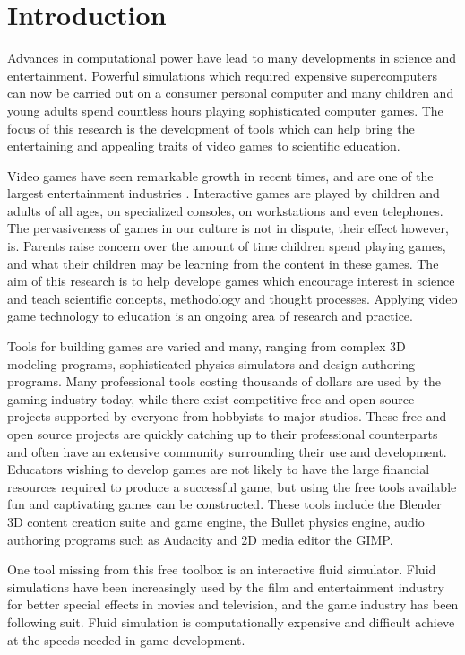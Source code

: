 \chapter{Introduction}

Advances in computational power have lead to many developments in science and
entertainment. Powerful simulations which required expensive supercomputers can
now be carried out on a consumer personal computer and many children and young
adults spend countless hours playing sophisticated computer games. The focus of
this research is the development of tools which can help bring the entertaining
and appealing traits of video games to scientific education.


Video games have seen remarkable growth in recent times, and are one of the
largest entertainment industries \cite{needed}. Interactive games are played by
children and adults of all ages, on specialized consoles, on workstations and
even telephones. The pervasiveness of games in our culture is not in dispute,
their effect however, is.\cite{needed} Parents raise concern over the amount of time
children spend playing games, and what their children may be learning from the
content in these games. The aim of this research is to help develope games which
encourage interest in science and teach scientific concepts, methodology and
thought processes. Applying video game technology to education is an ongoing
area of research and practice\cite{needed}. 


Tools for building games are varied and many, ranging from complex 3D modeling
programs, sophisticated physics simulators and design authoring programs. Many
professional tools costing thousands of dollars are used by the gaming industry
today, while there exist competitive free and open source projects supported by
everyone from hobbyists to major studios. These free and open source projects
are quickly catching up to their professional counterparts and often have an
extensive community surrounding their use and development. Educators wishing to
develop games are not likely to have the large financial resources required to
produce a successful game, but using the free tools available fun and
captivating games can be constructed. These tools include the Blender 3D
content creation suite and game engine, the Bullet physics engine, audio
authoring programs such as Audacity and 2D media editor the GIMP. 


One tool missing from this free toolbox is an interactive fluid simulator.
Fluid simulations have been increasingly used by the film and entertainment
industry for better special effects in movies and television, and the game
industry has been following suit. Fluid simulation is computationally expensive
and difficult achieve at the speeds needed in game development. 

